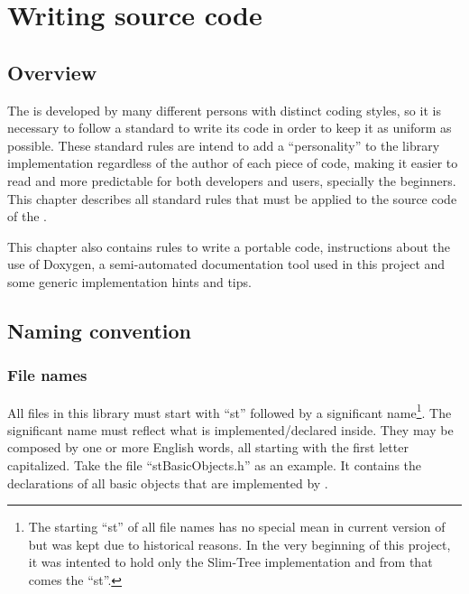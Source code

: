 \chapter{Writing \libname{ }source code}
\label{cha:coding}

\section{Overview}
\label{sec:coding.overview}

The \libname{ }is developed by many different persons with distinct coding styles, so it is necessary to follow a standard to write its code in order to keep it as uniform as possible. These standard rules are intend to add a ``personality'' to the library implementation regardless of the author of each piece of code, making it easier to read and more predictable for both developers and users, specially the beginners. This chapter describes all standard rules that must be applied to the source code of the \libname.

This chapter also contains rules to write a portable code, instructions about the use of Doxygen, a semi-automated documentation tool used in this project and some generic implementation hints and tips.

\section{Naming convention}
\label{sec:coding.names}

\subsection{File names}
\label{sec:coding.fnames}

All files in this library must start with ``st'' followed by a significant name\footnote{The starting ``st'' of all file names has no special mean in current version of \libname{ }but was kept due to historical reasons. In the very beginning of this project, it was intented to hold only the Slim-Tree implementation and from that comes the ``st''.}. The significant name must reflect what is implemented/declared inside. They may be composed by one or more English words, all starting with the first letter capitalized. Take the file ``stBasicObjects.h'' as an example. It contains the declarations of all basic objects that are implemented by \libname.

